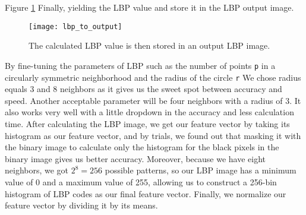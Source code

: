 Figure \ref{fig:lbp_to_output} Finally, yielding the LBP value and store it in the LBP output image.
\begin{figure}
    \centering
    \texttt{[image: lbp\_to\_output]}
    \caption{The calculated LBP value is then stored in an output LBP image.}
    \label{fig:lbp_to_output}
\end{figure}

By fine-tuning the parameters of LBP such as the number of points \texttt{p} in a circularly symmetric neighborhood and the radius of the circle \texttt{r}
We chose radius equals 3 and 8 neighbors as it gives us the sweet spot between accuracy and speed. Another acceptable parameter will be four neighbors with a radius of 3. It also works very well with a little dropdown in the accuracy and less calculation time.
After calculating the LBP image, we get our feature vector by taking its histogram as our feature vector, and by trials, we found out that masking it with the binary image to calculate only the histogram for the black pixels in the binary image gives us better accuracy.
Moreover, because we have eight neighbors, we got $2 ^ 8 = 256$ possible patterns, so our LBP image has a minimum value of 0 and a maximum value of 255, allowing us to construct a 256-bin histogram of LBP codes as our final feature vector.
Finally, we normalize our feature vector by dividing it by its means.